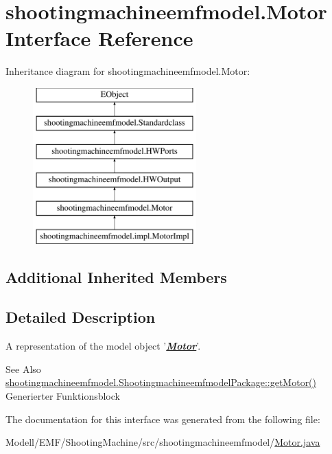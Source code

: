 \hypertarget{interfaceshootingmachineemfmodel_1_1_motor}{\section{shootingmachineemfmodel.\-Motor Interface Reference}
\label{interfaceshootingmachineemfmodel_1_1_motor}
}
Inheritance diagram for shootingmachineemfmodel.\-Motor\-:\begin{figure}[H]
\begin{center}
\leavevmode
\includegraphics[height=6.000000cm]{interfaceshootingmachineemfmodel_1_1_motor}
\end{center}
\end{figure}
\subsection*{Additional Inherited Members}


\subsection{Detailed Description}
A representation of the model object '{\itshape {\bfseries \hyperlink{interfaceshootingmachineemfmodel_1_1_motor}{Motor}}}'.

\begin{DoxySeeAlso}{See Also}
\hyperlink{interfaceshootingmachineemfmodel_1_1_shootingmachineemfmodel_package_a1d805c5360001d5b59912ffffce76733}{shootingmachineemfmodel.\-Shootingmachineemfmodel\-Package\-::get\-Motor()}  Generierter Funktionsblock 
\end{DoxySeeAlso}


The documentation for this interface was generated from the following file\-:\begin{DoxyCompactItemize}
\item 
Modell/\-E\-M\-F/\-Shooting\-Machine/src/shootingmachineemfmodel/\hyperlink{_motor_8java}{Motor.\-java}\end{DoxyCompactItemize}

